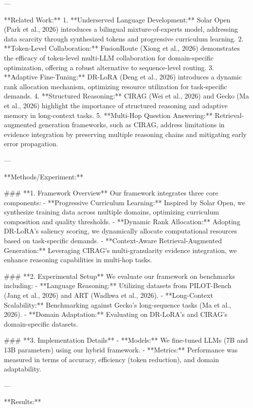 ---

**Related Work:**  
1. **Underserved Language Development:** Solar Open (Park et al., 2026) introduces a bilingual mixture-of-experts model, addressing data scarcity through synthesized tokens and progressive curriculum learning.  
2. **Token-Level Collaboration:** FusionRoute (Xiong et al., 2026) demonstrates the efficacy of token-level multi-LLM collaboration for domain-specific optimization, offering a robust alternative to sequence-level routing.  
3. **Adaptive Fine-Tuning:** DR-LoRA (Deng et al., 2026) introduces a dynamic rank allocation mechanism, optimizing resource utilization for task-specific demands.  
4. **Structured Reasoning:** CIRAG (Wei et al., 2026) and Gecko (Ma et al., 2026) highlight the importance of structured reasoning and adaptive memory in long-context tasks.  
5. **Multi-Hop Question Answering:** Retrieval-augmented generation frameworks, such as CIRAG, address limitations in evidence integration by preserving multiple reasoning chains and mitigating early error propagation.  

---

**Methods/Experiment:**  

### **1. Framework Overview**  
Our framework integrates three core components:  
- **Progressive Curriculum Learning:** Inspired by Solar Open, we synthesize training data across multiple domains, optimizing curriculum composition and quality thresholds.  
- **Dynamic Rank Allocation:** Adopting DR-LoRA’s saliency scoring, we dynamically allocate computational resources based on task-specific demands.  
- **Context-Aware Retrieval-Augmented Generation:** Leveraging CIRAG's multi-granularity evidence integration, we enhance reasoning capabilities in multi-hop tasks.  

### **2. Experimental Setup**  
We evaluate our framework on benchmarks including:  
- **Language Reasoning:** Utilizing datasets from PILOT-Bench (Jang et al., 2026) and ART (Wadhwa et al., 2026).  
- **Long-Context Scalability:** Benchmarking against Gecko’s long-sequence tasks (Ma et al., 2026).  
- **Domain Adaptation:** Evaluating on DR-LoRA’s and CIRAG’s domain-specific datasets.  

### **3. Implementation Details**  
- **Models:** We fine-tuned LLMs (7B and 13B parameters) using our hybrid framework.  
- **Metrics:** Performance was measured in terms of accuracy, efficiency (token reduction), and domain adaptability.  

---

**Results:**  

